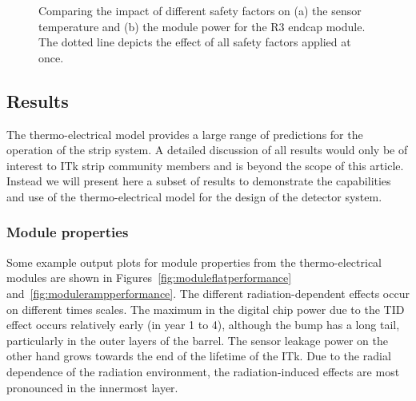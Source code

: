 \begin{figure}[ht]
\centering
{}
\caption{Comparing the impact of different safety factors on (a) the sensor temperature and
(b) the module power for the R3 endcap module. The dotted line depicts the effect of all safety
factors applied at once.}
\label{fig:safety_factors}
\end{figure}

\subsection{Results}
The thermo-electrical model provides a large range of predictions for the operation of the strip system. A detailed discussion of all results would only be of interest to ITk strip community members and is beyond the scope of this article. Instead we will present here a subset of results to demonstrate the capabilities and use of the thermo-electrical model for the design of the detector system.

\subsubsection{Module properties}

Some example output plots for module properties from the thermo-electrical modules are shown in Figures~\ref{fig:moduleflatperformance} and~\ref{fig:modulerampperformance}. The different radiation-dependent effects occur on different times scales. The maximum in the digital chip power due to the TID effect occurs relatively early (in year 1 to 4), although the bump has a long tail, particularly in the outer layers of the barrel. The sensor leakage power on the other hand grows towards the end of the lifetime of the ITk. Due to the radial dependence of the radiation environment, the radiation-induced effects are most pronounced in the innermost layer.

